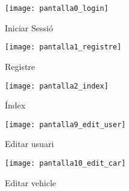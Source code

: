 \begin{slide}
        \begin{figure}[H]
        \centering
        \texttt{[image: pantalla0\_login]}
        \caption{Iniciar Sessió}
    \end{figure}
\end{slide}
\begin{slide}
        \begin{figure}[H]
        \centering
        \texttt{[image: pantalla1\_registre]}
        \caption{Registre}
    \end{figure}
\end{slide}
\begin{slide}
        \begin{figure}[H]
        \centering
        \texttt{[image: pantalla2\_index]}
        \caption{Índex}
    \end{figure}
\end{slide}
\begin{slide}
        \begin{figure}[H]
        \centering
        \texttt{[image: pantalla9\_edit\_user]}
        \caption{Editar usuari}
    \end{figure}
\end{slide}
\begin{slide}
        \begin{figure}[H]
        \centering
        \texttt{[image: pantalla10\_edit\_car]}
        \caption{Editar vehicle}
    \end{figure}
\end{slide}


